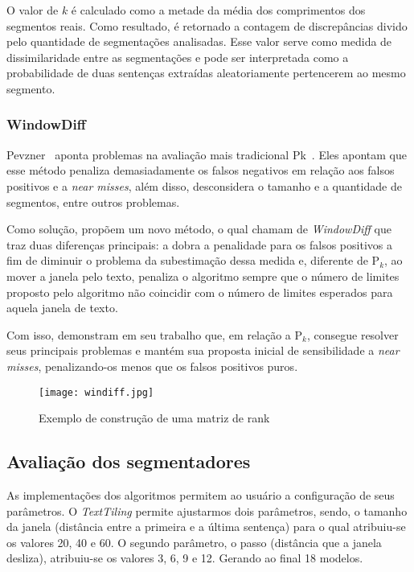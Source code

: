 O valor de $k$ é calculado como a metade da média dos comprimentos dos segmentos reais. Como resultado, é retornado a contagem de discrepâncias divido pelo quantidade de segmentações analisadas. Esse valor serve como medida de dissimilaridade entre as segmentações e pode ser interpretada como a probabilidade de duas sentenças extraídas aleatoriamente pertencerem ao mesmo segmento.



\subsubsection{WindowDiff}

Pevzner~\cite{Pevzner200219} aponta problemas na avaliação mais tradicional Pk~\cite{Beeferman1999}. Eles apontam que esse método penaliza demasiadamente os falsos negativos em relação aos falsos positivos e a \textit{near misses}, além disso, desconsidera o tamanho e a quantidade de segmentos, entre outros problemas.

Como solução, propõem um novo método, o qual chamam de \textit{WindowDiff} que traz duas diferenças principais: a dobra a penalidade para os falsos positivos a fim de diminuir o problema da subestimação dessa medida e, diferente de P$_k$, ao mover a janela pelo texto, penaliza o algoritmo sempre que o número de limites proposto pelo algoritmo não coincidir com o número de limites esperados para aquela janela de texto. 

Com isso, demonstram em seu trabalho que, em relação a P$_k$, consegue resolver seus principais problemas e mantém sua proposta inicial de sensibilidade a \textit{near misses}, penalizando-os menos que os falsos positivos puros.


  \begin{figure}[!h]

	\centering
	\texttt{[image: windiff.jpg]}
	\caption{Exemplo de construção de uma matriz de rank}
	\label{fig:exemplosegmentacao}

  \end{figure}
  
  



\subsection{Avaliação dos segmentadores}


As implementações dos algoritmos permitem ao usuário a configuração de seus parâmetros. 
%
O \textit{TextTiling} permite ajustarmos dois parâmetros, sendo, o tamanho da janela (distância entre a primeira e a última sentença) para o qual atribuiu-se os valores 20, 40 e 60. O segundo parâmetro, o passo (distância que a janela desliza), atribuiu-se os valores 3, 6, 9 e 12. Gerando ao final 18 modelos.
%

